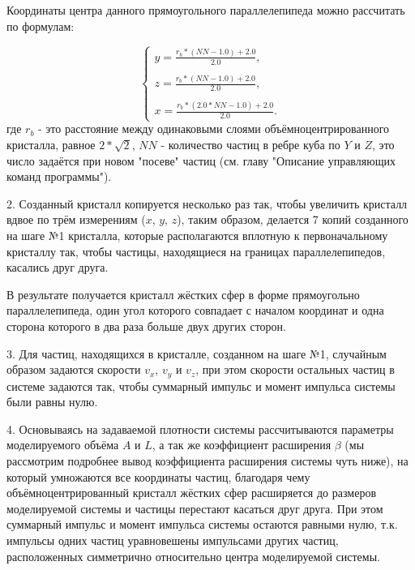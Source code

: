 \documentclass{article}
\begin{document}
Координаты центра данного прямоугольного параллелепипеда можно рассчитать по формулам:

\begin{equation}\label{eq:r_scalar}
    \begin{cases}
        y = \displaystyle\frac{r_b * (NN - 1.0) + 2.0}{2.0},
        \\
        \\
        z = \displaystyle\frac{r_b * (NN - 1.0) + 2.0}{2.0},
        \\
        \\
        x = \displaystyle\frac{r_b * (2.0 * NN - 1.0) + 2.0}{2.0}.
    \end{cases}
\end{equation}
где $ r_b $ - это расстояние между одинаковыми слоями объёмноцентрированного кристалла, равное $ 2*\sqrt{2} $, $ NN $ - количество частиц в ребре куба по $ Y $ и $ Z $, это число задаётся при новом "посеве" частиц (см. главу "Описание управляющих команд программы").

2. Созданный кристалл копируется несколько раз так, чтобы увеличить кристалл вдвое по трём измерениям ($x$, $y$, $z$), таким образом, делается 7 копий созданного на шаге №1 кристалла, которые располагаются вплотную к первоначальному кристаллу так, чтобы частицы, находящиеся на границах параллелепипедов, касались друг друга.

В результате получается кристалл жёстких сфер в форме прямоугольно параллелепипеда, один угол которого совпадает с началом координат и одна сторона которого в два раза больше двух других сторон.

3. Для частиц, находящихся в кристалле, созданном на шаге №1, случайным образом задаются скорости $ v_x $, $ v_y $ и $ v_z $, при этом скорости остальных частиц в системе задаются так, чтобы суммарный импульс и момент импульса системы были равны нулю.

4. Основываясь на задаваемой плотности системы рассчитываются параметры моделируемого объёма $ A $ и $ L $, а так же коэффициент расширения $ \beta $ (мы рассмотрим подробнее вывод коэффициента расширения системы чуть ниже), на который умножаются все координаты частиц, благодаря чему объёмноцентрированный кристалл жёстких сфер расширяется до размеров моделируемой системы и частицы перестают касаться друг друга. При этом суммарный импульс и момент импульса системы остаются равными нулю, т.к. импульсы одних частиц уравновешены импульсами других частиц, расположенных симметрично относительно центра моделируемой системы.
\end{document}
